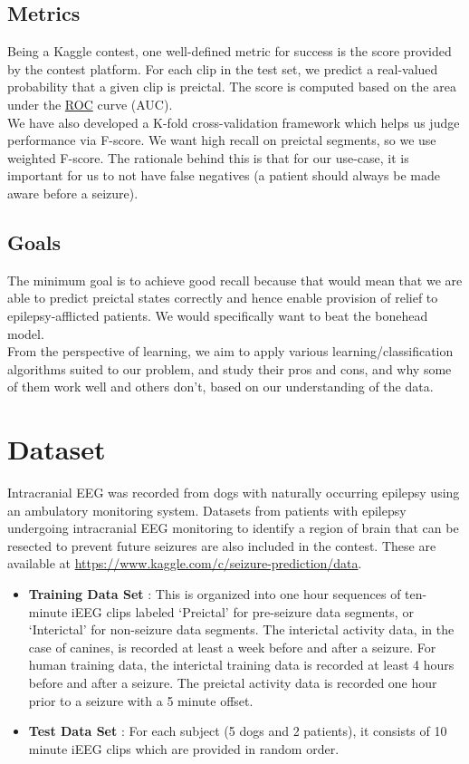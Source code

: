 \documentclass[a4paper]{article}
\begin{document}
\subsection{Metrics} 
Being a Kaggle contest, one well-defined metric for success is the score provided by the contest platform. For each clip in the test set, we predict a real-valued probability that a given clip is preictal. The score is computed based on the area under the \href{http://en.wikipedia.org/wiki/Receiver_operating_characteristic}{ROC} curve (AUC). \\

We have also developed a K-fold cross-validation framework which helps us judge performance via F-score. We want high recall on preictal segments, so we use weighted F-score. The rationale behind this is that for our use-case, it is important for us to not have false negatives (a patient should always be made aware before a seizure).

\subsection{Goals}
The minimum goal is to achieve good recall because that would mean that we are able to predict preictal states correctly and hence enable provision of relief to epilepsy-afflicted patients. We would specifically want to beat the bonehead model. \\
From the perspective of learning, we aim to apply various learning/classification algorithms suited to our problem, and study their pros and cons, and why some of them work well and others don't, based on our understanding of the data.

\section{Dataset}
Intracranial EEG was recorded from dogs with naturally occurring epilepsy using an ambulatory monitoring system. Datasets from patients with epilepsy undergoing intracranial EEG monitoring to identify a region of brain that can be resected to prevent future seizures are also included in the contest. These are available at \url{https://www.kaggle.com/c/seizure-prediction/data}. 
\begin{itemize}
\item \textbf{Training Data Set} : This is organized into one hour sequences of ten-minute iEEG clips labeled `Preictal' for pre-seizure data segments, or `Interictal' for non-seizure data segments. The interictal activity data, in the case of canines, is recorded at least a week before and after a seizure. For human training data, the interictal training data is recorded at least 4 hours before and after a seizure. The preictal activity data is recorded one hour prior to a seizure with a 5 minute offset.
\item \textbf{Test Data Set} : For each subject (5 dogs and 2 patients), it consists of 10 minute iEEG clips which are
provided in random order. 
\end{itemize}
\end{document}

